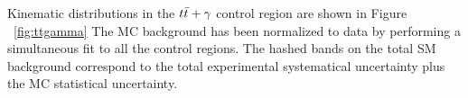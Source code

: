 %
%    

\indent Kinematic distributions in the $t\bar{t}+\gamma$ control region are shown in Figure ~\ref{fig:ttgamma}  The MC background has been normalized to data by performing a simultaneous fit to all the control regions.  The hashed bands on the total SM background correspond to the total experimental systematical uncertainty plus the MC statistical uncertainty.   \\


